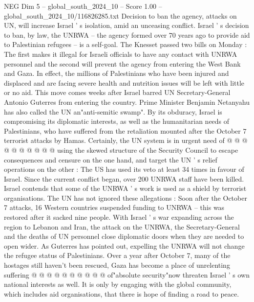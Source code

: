 \begin{textsample}{NEG Dim 5 – global\_south\_2024\_10 – Score 1.00 – global\_south\_2024\_10/116826285.txt}  \label{ex:f5_neg_108}
Decision to ban the agency, attacks on UN, will increase Israel ' s isolation, amid an unceasing conflict.
Israel ' s decision to ban, by law, the UNRWA -- the agency formed over 70 years ago to provide aid to Palestinian refugees -- is a self-goal.
The Knesset passed two bills on Monday : The first makes it illegal for Israeli officials to have any contact with UNRWA personnel and the second will prevent the agency from entering the West Bank and Gaza.
In effect, the millions of Palestinians who have been injured and displaced and are facing severe health and nutrition issues will be left with little or no aid.
This move comes weeks after Israel barred UN Secretary-General Antonio Guterres from entering the country.
Prime Minister Benjamin Netanyahu has also called the UN an"anti-semitic swamp".
By its obduracy, Israel is compromising its diplomatic interests, as well as the humanitarian needs of Palestinians, who have suffered from the retaliation mounted after the October 7 terrorist attacks by Hamas.
Certainly, the UN system is in urgent need of @ @ @ @ @ @ @ @ @ @ using the skewed structure of the Security Council to escape consequences and censure on the one hand, and target the UN ' s relief operations on the other : The US has used its veto at least 34 times in favour of Israel.
Since the current conflict began, over 200 UNRWA staff have been killed.
Israel contends that some of the UNRWA ' s work is used as a shield by terrorist organisations.
The UN has not ignored these allegations : Soon after the October 7 attacks, 16 Western countries suspended funding to UNRWA -- this was restored after it sacked nine people.
With Israel ' s war expanding across the region to Lebanon and Iran, the attack on the UNRWA, the Secretary-General and the deaths of UN personnel close diplomatic doors when they are needed to open wider.
As Guterres has pointed out, expelling the UNRWA will not change the refugee status of Palestinians.
Over a year after October 7, many of the hostages still haven't been rescued, Gaza has become a place of unrelenting suffering @ @ @ @ @ @ @ @ @ @ of"absolute security"now threaten Israel ' s own national interests as well.
It is only by engaging with the global community, which includes aid organisations, that there is hope of finding a road to peace.

\end{textsample}
